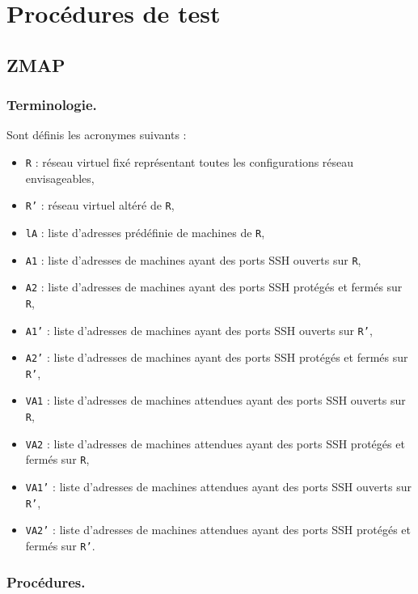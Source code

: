\documentclass[a4paper,11pt,french]{article}
\begin{document}
\section{Procédures de test}
\subsection{ZMAP}
\subsubsection*{Terminologie.}
Sont définis les acronymes suivants : 
\begin{itemize}
	\item \texttt{R} : réseau virtuel fixé représentant toutes les configurations réseau envisageables,
	\item \texttt{R'} : réseau virtuel altéré de \texttt{R},
	\item \texttt{lA} : liste d'adresses prédéfinie de machines de \texttt{R},
	\item \texttt{A1} : liste d'adresses de machines ayant des ports SSH ouverts sur \texttt{R},
	\item \texttt{A2} : liste d'adresses de machines ayant des ports SSH protégés et fermés sur \texttt{R},
	\item \texttt{A1'} : liste d'adresses de machines ayant des ports SSH ouverts sur \texttt{R'},
	\item \texttt{A2'} : liste d'adresses de machines ayant des ports SSH protégés et fermés sur \texttt{R'},
	\item \texttt{VA1} : liste d'adresses de machines attendues ayant des ports SSH ouverts sur \texttt{R},
	\item \texttt{VA2} : liste d'adresses de machines attendues ayant des ports SSH protégés et fermés sur \texttt{R},
	\item \texttt{VA1'} : liste d'adresses de machines attendues ayant des ports SSH ouverts sur \texttt{R'},
	\item \texttt{VA2'} : liste d'adresses de machines attendues ayant des ports SSH protégés et fermés sur \texttt{R'}.
\end{itemize}


\subsubsection*{Procédures.}
\end{document}
